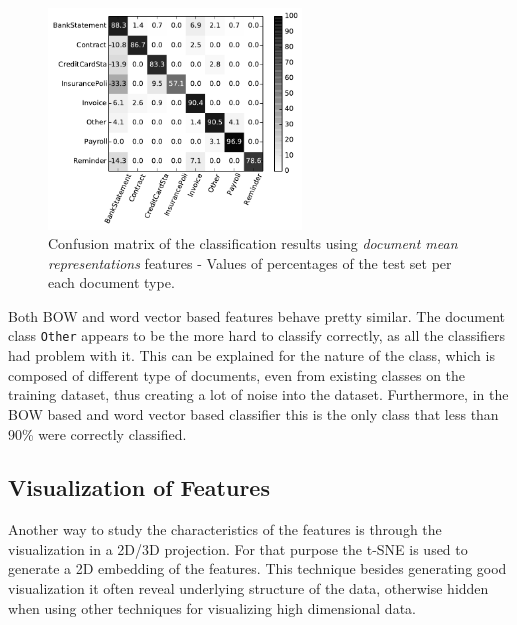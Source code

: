  \begin{figure}[!htpb]
    \centering
    \includegraphics[width=0.6\textwidth]{images/004-xvalidaton-handcrafted.pdf}
    \caption{Confusion matrix of the classification results  using \textit{document mean
      representations} features - Values of percentages of the test set per
    each document type.}
    \label{fig:confusion-matrix-handcrafted}
\end{figure}

Both \ac{BOW} and word vector based features behave pretty similar. The
document class \texttt{Other} appears  to be the more hard to classify
correctly, as all the classifiers  had problem with it. This can be explained
for the nature of the class, which is composed  of different type of
documents, even from existing classes on the training dataset, thus creating
a lot of noise into the dataset. Furthermore, in the \ac{BOW} based and word
vector based classifier this is the only class that less than 90\% were
correctly classified.

\subsection{Visualization of Features}
\label{sec:sub_w2v4tc_viz_features}

Another way to study  the characteristics of the features   is through the
visualization in a 2D/3D projection. For that purpose the \ac{t-SNE} is used
to generate a 2D embedding of the features. This technique besides generating
good visualization it often reveal underlying structure of the data,
otherwise hidden when using other techniques for visualizing high dimensional
data.

